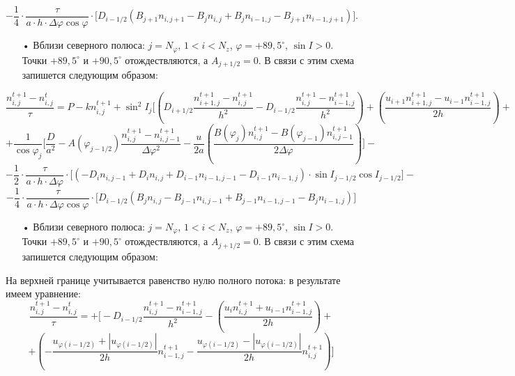 \documentclass[2pt, a4paper, fleqn]{extarticle}
\begin{document}
$$-\dfrac{1}{4}\cdot\dfrac{\tau}{a\cdot h\cdot \Delta\varphi\cos\varphi}\cdot\bigg[D_{i-1/2}(B_{j+1} n_{i, j+1} - B_{j}n_{i, j} + B_{j}n_{i-1, j} - B_{j+1} n_{i-1, j+1})\bigg].$$

\begin{itemize}
\item[•] Вблизи северного полюса: $j = N_{\varphi}$, $1<i<N_z$, $\varphi = +89{,}5^\circ$, $\sin I > 0$. Точки $+89{,}5^\circ$ и $+90{,}5^\circ$ отождествляются, а $A_{j+1/2} = 0$. В связи с этим схема запишется следующим образом: 
\end{itemize}
$$\dfrac{n_{i,j}^{t+1}-n_{i,j}^t}{\tau} = P - k n_{i, j}^{t+1} + \sin^2 I_j\bigg[\left(D_{i+1/2}\dfrac{n_{i+1, j}^{t+1}-n_{i,j}^{t+1}}{h^2}-D_{i-1/2}\dfrac{n_{i,j}^{t+1}-n_{i-1,j}^{t+1}}{h^2}\right)+\left(\dfrac{u_{i+1}n_{i+1,j}^{t+1}-u_{i-1}n_{i-1,j}^{t+1}}{2h}\right) + $$ $$+\dfrac{1}{\cos\varphi_j} \bigg[\dfrac{D}{a^2}-A(\varphi_{j-1/2})\dfrac{n_{i,j}^{t+1}-n_{i,j-1}^{t+1}}{\Delta\varphi^2}-\dfrac{u}{2a}\left(\dfrac{B(\varphi_{j})n_{i,j}^{t+1}-B(\varphi_{j-1})n_{i,j-1}^{t+1}}{2\Delta\varphi}\right)\bigg] -$$
$$-\dfrac{1}{2}\cdot\dfrac{\tau}{a\cdot h\cdot \Delta\varphi}\cdot\bigg[(-D_i n_{i, j-1} + D_i n_{i, j} + D_{i-1} n_{i-1, j-1} - D_{i-1} n_{i-1, j})\cdot \sin I_{j-1/2}\cos I_{j-1/2}\bigg]-$$
$$-\dfrac{1}{4}\cdot\dfrac{\tau}{a\cdot h\cdot \Delta\varphi\cos\varphi}\cdot\bigg[D_{i-1/2}(B_j n_{i, j} - B_{j-1}n_{i, j-1} + B_{j-1}n_{i-1, j-1} - B_j n_{i-1, j})\bigg]$$

\begin{itemize}
\item[•] Вблизи северного полюса: $j = N_{\varphi}$, $1<i<N_z$, $\varphi = +89{,}5^\circ$, $\sin I > 0$. Точки $+89{,}5^\circ$ и $+90{,}5^\circ$ отождествляются, а $A_{j+1/2} = 0$. В связи с этим схема запишется следующим образом: 
\end{itemize}

На верхней границе учитывается равенство нулю полного потока: в результате имеем уравнение: 
$$\dfrac{n_{i,j}^{t+1}-n_{i,j}^t}{\tau} = + \bigg[-D_{i-1/2}\dfrac{n_{i,j}^{t+1}-n_{i-1,j}^{t+1}}{h^2}-\left(\dfrac{u_{i}n_{i,j}^{t+1}+u_{i-1}n_{i-1,j}^{t+1}}{2h}\right) +$$ $$+ \left(-\dfrac{u_{\varphi(i-1/2)}+|u_{\varphi(i-1/2)}|}{2h}n_{i-1,j}^{t+1}-\dfrac{u_{\varphi(i-1/2)}-|u_{\varphi(i-1/2)}|}{2h} n_{i,j}^{t+1}\right) \bigg]$$
\end{document}
